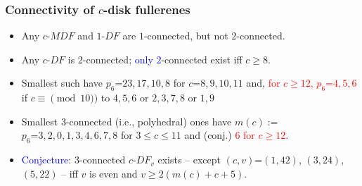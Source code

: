 \documentclass{beamer}
\begin{document}
\begin{frame}\frametitle{Connectivity of  $c$-disk fullerenes}
\vspace{-5mm}
\begin{itemize}


\item
Any $c$-$MDF$ and $1$-$DF$ are $1$-connected, but not $2$-connected.
\item Any $c$-$DF$ 
 is $2$-connected; \textcolor{blue}{only $2$}-connected
exist iff $c$$\ge$$8$. 
\item 
Smallest 
such 
have $p_6$=$23,17,10,8$ for $c$=$8,9,10,11$
and, 
\textcolor{red}{for $c$$\ge$$12$, $p_6$=$4,5,6$} if $c$$\equiv $$\pmod{10})$ to $4,5,6$ or $2,3,7,8$ or $1,9$
\item Smallest 
$3$-connected (i.e., polyhedral) ones
have $m(c):=$\\$p_6$=$3, 2, 0, 1,3,4,6 ,7 ,8$ for $3$$\le$$c$$\le$$11$ and (conj.)  
\textcolor{red}{$6$ for $c$$\ge$$12$}.
\item 
\textcolor{blue}{Conjecture}:
 $3$-connected $c$-$DF_v$  exists --
except $(c,v)$=$(1,42)$, $(3,24)$, $(5,22)$ --
iff $v$ is even and $v \ge 2(m(c)+c+5)$.

\end{itemize}

\end{frame}
\end{document}
